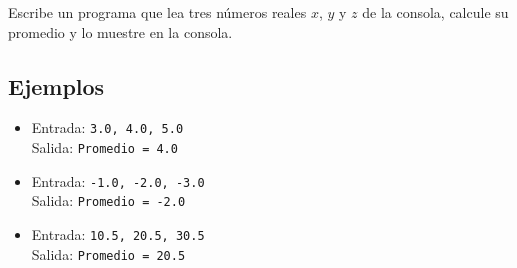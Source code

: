 Escribe un programa que lea tres números reales \(x\), \(y\) y \(z\) de la consola, calcule su promedio y lo muestre en la consola.
\subsection*{Ejemplos}
\begin{itemize}
    \item Entrada: \texttt{3.0, 4.0, 5.0}\\
          Salida: \texttt{Promedio = 4.0}
    \item Entrada: \texttt{-1.0, -2.0, -3.0}\\
          Salida: \texttt{Promedio = -2.0}
    \item Entrada: \texttt{10.5, 20.5, 30.5}\\
          Salida: \texttt{Promedio = 20.5}
\end{itemize}